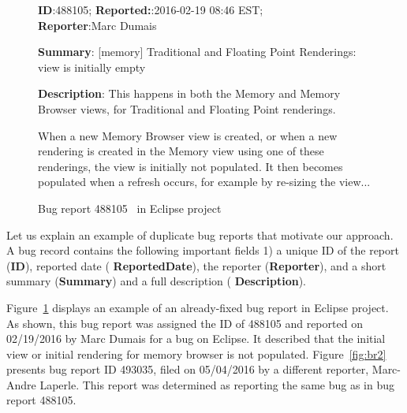 \begin{figure}[t]
\sf
\scriptsize
\textbf{ID}:488105; \textbf{Reported:}:2016-02-19 08:46 EST; \\\textbf{Reporter}:Marc Dumais

\textbf{Summary}:  [memory] Traditional and Floating Point Renderings: view is initially empty

\textbf{Description}: This happens in both the Memory and Memory Browser views, for Traditional and Floating Point renderings. 

When a new Memory Browser view is created, or when a new rendering is
created in the Memory view using one of these renderings, the view is
initially not populated. It then becomes populated when a refresh
occurs, for example by re-sizing the view...
\caption{Bug report 488105~\cite{bug488105} in Eclipse project}
\label{fig:br1}
\end{figure}



Let us explain an example of duplicate bug reports that motivate our
approach.
A bug record contains the following important fields 1) a unique ID
of the report (\textbf{\sf ID}), reported date (\textbf{\sf
  ReportedDate}), the reporter (\textbf{\sf Reporter}), and a short
summary (\textbf{\sf Summary}) and a full description (\textbf{\sf
  Description}).

Figure~\ref{fig:br1} displays an example of an already-fixed bug
report in Eclipse project. As shown, this bug report was assigned the
ID of 488105 and reported on 02/19/2016 by Marc Dumais for a bug on
Eclipse. It described that the initial view or initial rendering for
memory browser is not populated.
Figure~\ref{fig:br2} presents bug report ID 493035, filed on
05/04/2016 by a different reporter, Marc-Andre Laperle. This report
was determined as reporting the same bug as in bug report 488105.


